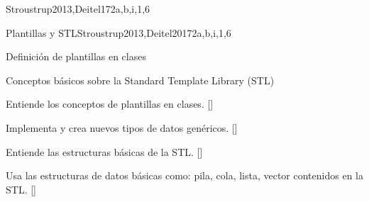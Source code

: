 \begin{syllabus}
\begin{unit}{\PLObjectOrientedProgramming}{}{Stroustrup2013,Deitel17}{2}{a,b,i,1,6}
    \begin{topics}
        \item \PLObjectOrientedProgrammingTopicObject
        \item \PLObjectOrientedProgrammingTopicObjectOriented
        \item \PLObjectOrientedProgrammingTopicDefinition
        \item \PLObjectOrientedProgrammingTopicSubclasses
        \item \PLObjectOrientedProgrammingTopicSubtyping
        \item \PLObjectOrientedProgrammingTopicUsing
        \item \PLObjectOrientedProgrammingTopicDynamic
    \end{topics}
    \begin{learningoutcomes}
        \item \PLObjectOrientedProgrammingLODesignAndClass [\Usage]
        \item \PLObjectOrientedProgrammingLOUseSubclassing [\Usage]
        \item \PLObjectOrientedProgrammingLOCorrectly [\Usage]
        \item \PLObjectOrientedProgrammingLOCompareAndThe [\Assessment]
        \item \PLObjectOrientedProgrammingLOExplainTheObject [\Familiarity]
        \item \PLObjectOrientedProgrammingLOUseObject [\Usage]
        \item \PLObjectOrientedProgrammingLODefineAndAnd [\Usage]
    \end{learningoutcomes}
\end{unit}

\begin{unit}{Plantillas y STL}{}{Stroustrup2013,Deitel2017}{2}{a,b,i,1,6}
    \begin{topics}%
        \item Definición de plantillas en clases
        \item Conceptos básicos sobre la Standard Template Library (STL)
      
    \end{topics}
    \begin{learningoutcomes}
        \item  Entiende los conceptos de plantillas en clases. [\Familiarity]
        \item  Implementa y crea nuevos tipos de datos genéricos. [\Usage]
        \item  Entiende las estructuras básicas de la STL. [\Familiarity]
        \item  Usa las estructuras de datos básicas como: pila, cola, lista, vector contenidos en la STL. [\Usage]


\end{learningoutcomes}
\end{unit}
\end{syllabus}
